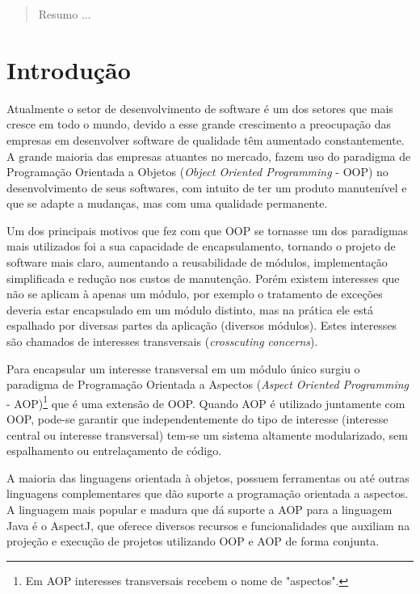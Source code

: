 \documentclass[tc,openright]{iiufrgs}
\begin{document}
\listoffigures

\listoftables

\begin{abstract}

Resumo ...

\end{abstract}


\chapter{Introdução}
Atualmente o setor de desenvolvimento de software é um dos setores que mais cresce em todo o mundo, devido a esse grande crescimento a preocupação das empresas em desenvolver software de qualidade têm aumentado constantemente. A grande maioria das empresas atuantes no mercado, fazem uso do paradigma de Programação Orientada a Objetos (\textit{Object Oriented Programming} - OOP) no desenvolvimento de seus softwares, com intuito de ter um produto manutenível e que se adapte a mudanças, mas com uma qualidade permanente.

Um dos principais motivos que fez com que OOP se tornasse um dos paradigmas mais utilizados foi a sua capacidade de encapsulamento, tornando o projeto de software mais claro, aumentando a reusabilidade de módulos, implementação simplificada e redução nos custos de manutenção. Porém existem interesses que não se aplicam à apenas um módulo, por exemplo o tratamento de exceções deveria estar encapsulado em um módulo distinto, mas na prática ele está espalhado por diversas partes da aplicação (diversos módulos). Estes interesses são chamados de interesses transversais (\textit{crosscuting concerns}).

Para encapsular um interesse transversal em um módulo único surgiu o paradigma de Programação Orientada a Aspectos (\textit{Aspect Oriented Programming} - AOP)\footnote{Em AOP interesses transversais recebem o nome de "aspectos".} que é uma extensão de OOP. Quando AOP é utilizado juntamente com OOP, pode-se garantir que independentemente do tipo de interesse (interesse central ou interesse transversal) tem-se um sistema altamente modularizado, sem espalhamento ou entrelaçamento de código.

A maioria das linguagens orientada à objetos, possuem ferramentas ou até outras linguagens complementares que dão suporte a programação orientada a aspectos. A linguagem mais popular e madura que dá suporte a AOP para a linguagem Java é o AspectJ, que oferece diversos recursos e funcionalidades que auxiliam na projeção e execução de projetos utilizando OOP e AOP de forma conjunta.
\end{document}
